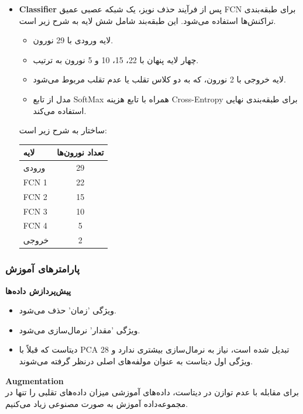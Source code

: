 \documentclass{article}
\begin{document}
\begin{itemize}
‎\item 
\textbf{Classifier}
 پس از فرآیند حذف نویز، یک شبکه عصبی عمیق FCN برای طبقه‌بندی تراکنش‌ها استفاده می‌شود. این طبقه‌بند شامل شش لایه به شرح زیر است.
 \begin{itemize}
    \item لایه ورودی با 29 نورون.
    \item چهار لایه پنهان با 22، 15، 10 و 5 نورون به ترتیب.
    \item لایه خروجی با 2 نورون، که به دو کلاس تقلب یا عدم تقلب مربوط می‌شود.
    \item مدل از تابع SoftMax همراه با تابع هزینه 
    Cross-Entropy
     برای طبقه‌بندی نهایی استفاده می‌کند.
 \end{itemize}
    ساختار به شرح زیر است:

    \begin{table}[H]
    \centering
    \begin{tabular}{|l|c|}
    \hline
    \textbf{لایه} & \textbf{تعداد نورون‌ها} \\
    \hline
    ورودی & 29 \\
    FCN 1 & 22 \\
    FCN 2 & 15 \\
    FCN 3 & 10 \\
    FCN 4 & 5 \\
    خروجی & 2 \\
    \hline
    \end{tabular}
    \end{table}
\end{itemize}
\subsubsection{پارامترهای آموزش}


\textbf{پیش‌پردازش داده‌ها}
\begin{itemize}
	\item ویژگی 'زمان' حذف می‌شود.
    \item ویژگی 'مقدار' نرمال‌سازی می‌شود.
    \item دیتاست که قبلاً با PCA تبدیل شده است، نیاز به نرمال‌سازی بیشتری    ندارد و 28 ویژگی اول دیتاست به عنوان مولفه‌های اصلی درنظر گرفته می‌شوند.
\end{itemize}
\textbf{Augmentation}\\
 برای مقابله با عدم توازن در دیتاست، داده‌های آموزشی میزان داده‌های تقلبی را تنها در مجموعه‌داده آموزش به صورت مصنوعی زیاد می‌کنیم.
\end{document}
